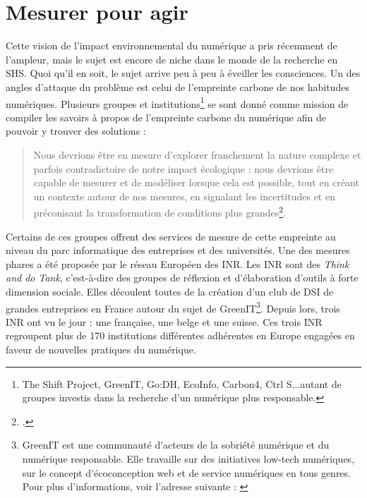 \documentclass[a4paper,12pt,twoside]{book}
\begin{document}
\section{Mesurer pour agir}
Cette vision de l'impact environnemental du numérique a pris récemment de l'ampleur, mais le sujet est encore de niche dans le monde de la recherche en SHS. Quoi qu'il en soit, le sujet arrive peu à peu à éveiller les consciences. Un des angles d'attaque du problème est celui de l'empreinte carbone de nos habitudes numériques. Plusieurs groupes et institutions\footnote{The Shift Project, GreenIT, Go:DH, EcoInfo, Carbon4, Ctrl S...autant de groupes investis dans la recherche d'un numérique plus responsable.} se sont donné comme mission de compiler les savoirs à propos de l'empreinte carbone du numérique afin de pouvoir y trouver des solutions :
\begin{quote}
    Nous devrions être en mesure d'explorer franchement la nature complexe et parfois contradictoire de notre impact écologique : nous devrions être capable de mesurer et de modéliser lorsque cela est possible, tout en créant un contexte autour de nos mesures, en signalant les incertitudes et en préconisant la transformation de conditions plus grandes\footcite{DHCC}.
\end{quote}
Certains de ces groupes offrent des services de mesure de cette empreinte au niveau du parc informatique des entreprises et des universités. Une des mesures phares a été proposée par le réseau Européen des \acrfull{INR}. Les \acrshort{INR} sont des \textit{Think and do Tank}, c'est-à-dire des groupes de réflexion et d'élaboration d'outils à forte dimension sociale. Elles découlent toutes de la création d'un club de DSI de grandes entreprises en France autour du sujet de GreenIT\footnote{GreenIT est une communauté d'acteurs de la sobriété numérique et du numérique responsable. Elle travaille sur des initiatives low-tech numériques, sur le concept d'écoconception web et de service numériques en tous genres. Pour plus d'informations, voir l'adresse suivante : \cite{greenit}}. Depuis lors, trois INR ont vu le jour : une française, une belge et une suisse. Ces trois \acrshort{INR} regroupent plus de 170 institutions différentes adhérentes en Europe engagées en faveur de nouvelles pratiques du numérique.
\end{document}
